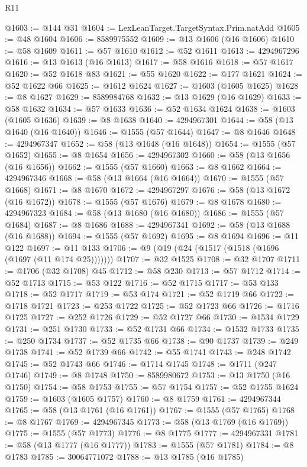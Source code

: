 \begin{lexlean}{R11}
\begin{coremodule}
@1603 := @144 @31
@1604 := LexLeanTarget.TargetSyntax.Prim.natAdd
@1605 := @48 @1604
@1606 := 8589975552
@1609 := @13 @1606 (@16 @1606)
@1610 := @58 @1609
@1611 := @57 @1610
@1612 := @52 @1611
@1613 := 4294967296
@1616 := @13 @1613 (@16 @1613)
@1617 := @58 @1616
@1618 := @57 @1617
@1620 := @52 @1618 @83
@1621 := @55 @1620
@1622 := @177 @1621
@1624 := @52 @1622 @66
@1625 := @1612 @1624
@1627 := @1603 (@1605 @1625)
@1628 := @8 @1627
@1629 := 8589984768
@1632 := @13 @1629 (@16 @1629)
@1633 := @58 @1632
@1634 := @57 @1633
@1636 := @52 @1634 @1624
@1638 := @1603 (@1605 @1636)
@1639 := @8 @1638
@1640 := 4294967301
@1644 := @58 (@13 @1640 (@16 @1640))
@1646 := @1555 (@57 @1644)
@1647 := @8 @1646
@1648 := 4294967347
@1652 := @58 (@13 @1648 (@16 @1648))
@1654 := @1555 (@57 @1652)
@1655 := @8 @1654
@1656 := 4294967302
@1660 := @58 (@13 @1656 (@16 @1656))
@1662 := @1555 (@57 @1660)
@1663 := @8 @1662
@1664 := 4294967346
@1668 := @58 (@13 @1664 (@16 @1664))
@1670 := @1555 (@57 @1668)
@1671 := @8 @1670
@1672 := 4294967297
@1676 := @58 (@13 @1672 (@16 @1672))
@1678 := @1555 (@57 @1676)
@1679 := @8 @1678
@1680 := 4294967323
@1684 := @58 (@13 @1680 (@16 @1680))
@1686 := @1555 (@57 @1684)
@1687 := @8 @1686
@1688 := 4294967341
@1692 := @58 (@13 @1688 (@16 @1688))
@1694 := @1555 (@57 @1692)
@1695 := @8 @1694
@1696 := @11 @122
@1697 := @11 @133
@1706 := @9 (@19 (@24 (@1517 (@1518 (@1696 (@1697 (@11 @174 @25)))))))
@1707 := @32 @1525
@1708 := @32 @1707
@1711 := @1706 (@32 @1708) @45
@1712 := @58 @230
@1713 := @57 @1712
@1714 := @52 @1713
@1715 := @53 @122
@1716 := @52 @1715
@1717 := @53 @133
@1718 := @52 @1717
@1719 := @53 @174
@1721 := @52 @1719 @66
@1722 := @1718 @1721
@1723 := @253 @1722
@1725 := @52 @1723 @66
@1726 := @1716 @1725
@1727 := @252 @1726
@1729 := @52 @1727 @66
@1730 := @1534 @1729
@1731 := @251 @1730
@1733 := @52 @1731 @66
@1734 := @1532 @1733
@1735 := @250 @1734
@1737 := @52 @1735 @66
@1738 := @90 @1737
@1739 := @249 @1738
@1741 := @52 @1739 @66
@1742 := @55 @1741
@1743 := @248 @1742
@1745 := @52 @1743 @66
@1746 := @1714 @1745
@1748 := @1711 (@247 @1746)
@1749 := @8 @1748
@1750 := 8589980672
@1753 := @13 @1750 (@16 @1750)
@1754 := @58 @1753
@1755 := @57 @1754
@1757 := @52 @1755 @1624
@1759 := @1603 (@1605 @1757)
@1760 := @8 @1759
@1761 := 4294967344
@1765 := @58 (@13 @1761 (@16 @1761))
@1767 := @1555 (@57 @1765)
@1768 := @8 @1767
@1769 := 4294967345
@1773 := @58 (@13 @1769 (@16 @1769))
@1775 := @1555 (@57 @1773)
@1776 := @8 @1775
@1777 := 4294967331
@1781 := @58 (@13 @1777 (@16 @1777))
@1783 := @1555 (@57 @1781)
@1784 := @8 @1783
@1785 := 30064771072
@1788 := @13 @1785 (@16 @1785)

\end{coremodule}
\end{lexlean}
